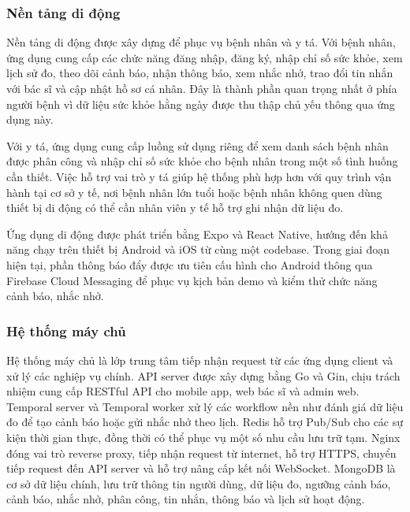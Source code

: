 \subsubsection{Nền tảng di động}
\par Nền tảng di động được xây dựng để phục vụ bệnh nhân và y tá. Với bệnh nhân, ứng dụng cung cấp các chức năng đăng nhập, đăng ký, nhập chỉ số sức khỏe, xem lịch sử đo, theo dõi cảnh báo, nhận thông báo, xem nhắc nhở, trao đổi tin nhắn với bác sĩ và cập nhật hồ sơ cá nhân. Đây là thành phần quan trọng nhất ở phía người bệnh vì dữ liệu sức khỏe hằng ngày được thu thập chủ yếu thông qua ứng dụng này.

\par Với y tá, ứng dụng cung cấp luồng sử dụng riêng để xem danh sách bệnh nhân được phân công và nhập chỉ số sức khỏe cho bệnh nhân trong một số tình huống cần thiết. Việc hỗ trợ vai trò y tá giúp hệ thống phù hợp hơn với quy trình vận hành tại cơ sở y tế, nơi bệnh nhân lớn tuổi hoặc bệnh nhân không quen dùng thiết bị di động có thể cần nhân viên y tế hỗ trợ ghi nhận dữ liệu đo.

\par Ứng dụng di động được phát triển bằng Expo và React Native, hướng đến khả năng chạy trên thiết bị Android và iOS từ cùng một codebase. Trong giai đoạn hiện tại, phần thông báo đẩy được ưu tiên cấu hình cho Android thông qua Firebase Cloud Messaging để phục vụ kịch bản demo và kiểm thử chức năng cảnh báo, nhắc nhở.

\subsubsection{Hệ thống máy chủ}
\par Hệ thống máy chủ là lớp trung tâm tiếp nhận request từ các ứng dụng client và xử lý các nghiệp vụ chính. API server được xây dựng bằng Go và Gin, chịu trách nhiệm cung cấp RESTful API cho mobile app, web bác sĩ và admin web. Temporal server và Temporal worker xử lý các workflow nền như đánh giá dữ liệu đo để tạo cảnh báo hoặc gửi nhắc nhở theo lịch. Redis hỗ trợ Pub/Sub cho các sự kiện thời gian thực, đồng thời có thể phục vụ một số nhu cầu lưu trữ tạm. Nginx đóng vai trò reverse proxy, tiếp nhận request từ internet, hỗ trợ HTTPS, chuyển tiếp request đến API server và hỗ trợ nâng cấp kết nối WebSocket. MongoDB là cơ sở dữ liệu chính, lưu trữ thông tin người dùng, dữ liệu đo, ngưỡng cảnh báo, cảnh báo, nhắc nhở, phân công, tin nhắn, thông báo và lịch sử hoạt động.

